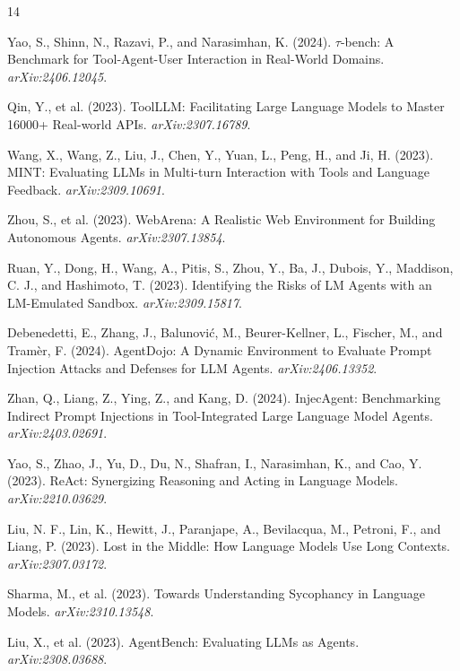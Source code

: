\documentclass[11pt,a4paper]{article}
\begin{document}
\begin{thebibliography}{14}

Yao, S., Shinn, N., Razavi, P., and Narasimhan, K. (2024).
\newblock $\tau$-bench: A Benchmark for Tool-Agent-User Interaction in Real-World Domains.
\newblock \emph{arXiv:2406.12045}.

Qin, Y., et al. (2023).
\newblock ToolLLM: Facilitating Large Language Models to Master 16000+ Real-world APIs.
\newblock \emph{arXiv:2307.16789}.

Wang, X., Wang, Z., Liu, J., Chen, Y., Yuan, L., Peng, H., and Ji, H. (2023).
\newblock MINT: Evaluating LLMs in Multi-turn Interaction with Tools and Language Feedback.
\newblock \emph{arXiv:2309.10691}.

Zhou, S., et al. (2023).
\newblock WebArena: A Realistic Web Environment for Building Autonomous Agents.
\newblock \emph{arXiv:2307.13854}.

Ruan, Y., Dong, H., Wang, A., Pitis, S., Zhou, Y., Ba, J., Dubois, Y., Maddison, C. J., and
Hashimoto, T. (2023).
\newblock Identifying the Risks of LM Agents with an LM-Emulated Sandbox.
\newblock \emph{arXiv:2309.15817}.

Debenedetti, E., Zhang, J., Balunovi\'c, M., Beurer-Kellner, L., Fischer, M., and Tram\`er, F.
(2024).
\newblock AgentDojo: A Dynamic Environment to Evaluate Prompt Injection Attacks and Defenses for
LLM Agents.
\newblock \emph{arXiv:2406.13352}.

Zhan, Q., Liang, Z., Ying, Z., and Kang, D. (2024).
\newblock InjecAgent: Benchmarking Indirect Prompt Injections in Tool-Integrated Large Language
Model Agents.
\newblock \emph{arXiv:2403.02691}.

Yao, S., Zhao, J., Yu, D., Du, N., Shafran, I., Narasimhan, K., and Cao, Y. (2023).
\newblock ReAct: Synergizing Reasoning and Acting in Language Models.
\newblock \emph{arXiv:2210.03629}.

Liu, N. F., Lin, K., Hewitt, J., Paranjape, A., Bevilacqua, M., Petroni, F., and Liang, P. (2023).
\newblock Lost in the Middle: How Language Models Use Long Contexts.
\newblock \emph{arXiv:2307.03172}.

Sharma, M., et al. (2023).
\newblock Towards Understanding Sycophancy in Language Models.
\newblock \emph{arXiv:2310.13548}.

Liu, X., et al. (2023).
\newblock AgentBench: Evaluating LLMs as Agents.
\newblock \emph{arXiv:2308.03688}.


\end{thebibliography}
\end{document}
